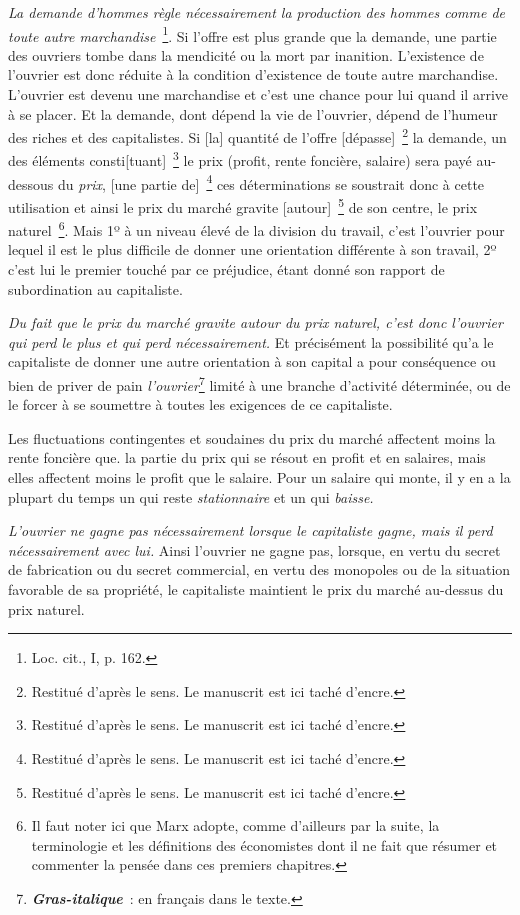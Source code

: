 \documentclass[french,twoside]{book} %
\newcommand\foreign[1]{\emph{#1}}
\begin{document}
\emph{La demande d’hommes règle nécessairement la production des hommes comme de toute autre marchandise} \footnote{Loc. cit., I, p. 162.}. Si l’offre est plus grande que la demande, une partie des ouvriers tombe dans la mendicité ou la mort par inanition. L’existence de l’ouvrier est donc réduite à la condition d’existence de toute autre marchandise. L’ouvrier est devenu une marchandise et c’est une chance pour lui quand il arrive à se placer. Et la demande, dont dépend la vie de l’ouvrier, dépend de l’humeur des riches et des capitalistes. Si [la] quantité de l’offre [dépasse] \footnote{Restitué d’après le sens. Le manuscrit est ici taché d’encre.} la demande, un des éléments consti[tuant] \footnote{Restitué d’après le sens. Le manuscrit est ici taché d’encre.} le prix (profit, rente foncière, salaire) sera payé au-dessous du \emph{prix}, [une partie de] \footnote{Restitué d’après le sens. Le manuscrit est ici taché d’encre.} ces déterminations se soustrait donc à cette utilisation et ainsi le prix du marché gravite [autour] \footnote{Restitué d’après le sens. Le manuscrit est ici taché d’encre.} de son centre, le prix naturel \footnote{Il faut noter ici que Marx adopte, comme d’ailleurs par la suite, la terminologie et les définitions des économistes dont il ne fait que résumer et commenter la pensée dans ces premiers chapitres.}. Mais 1º à un niveau élevé de la division du travail, c’est l’ouvrier pour lequel il est le plus difficile de donner une orientation différente à son travail, 2º c’est lui le premier touché par ce préjudice, étant donné son rapport de subordination au capitaliste.\par
\emph{Du fait que le prix du marché gravite autour du prix naturel, c’est donc l’ouvrier qui perd le plus et qui perd nécessairement.} Et précisément la possibilité qu’a le capitaliste de donner une autre orientation à son capital a pour conséquence ou bien de priver de pain \foreign{l’ouvrier}\footnote{\textbf{\emph{Gras-italique}} : en français dans le texte.} limité à une branche d’activité déterminée, ou de le forcer à se soumettre à toutes les exigences de ce capitaliste.\par
[II] Les fluctuations contingentes et soudaines du prix du marché affectent moins la rente foncière que. la partie du prix qui se résout en profit et en salaires, mais elles affectent moins le profit que le salaire. Pour un salaire qui monte, il y en a la plupart du temps un qui reste \emph{stationnaire} et un qui \emph{baisse.}\par
\emph{L’ouvrier ne gagne pas nécessairement lorsque le capitaliste gagne, mais il perd nécessairement avec lui.} Ainsi l’ouvrier ne gagne pas, lorsque, en vertu du secret de fabrication ou du secret commercial, en vertu des monopoles ou de la situation favorable de sa propriété, le capitaliste maintient le prix du marché au-dessus du prix naturel.\par
\end{document}
